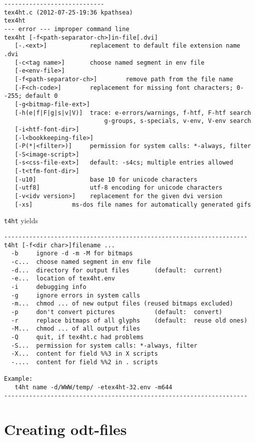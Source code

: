 \begin{Verbatim}[fontsize=\scriptsize]
----------------------------
tex4ht.c (2012-07-25-19:36 kpathsea)
tex4ht 
--- error --- improper command line
tex4ht [-f<path-separator-ch>]in-file[.dvi]
   [-.<ext>]            replacement to default file extension name .dvi
   [-c<tag name>]       choose named segment in env file
   [-e<env-file>]
   [-f<path-separator-ch>]        remove path from the file name
   [-F<ch-code>]        replacement for missing font characters; 0--255; default 0
   [-g<bitmap-file-ext>]
   [-h(e|f|F|g|s|v|V)]  trace: e-errors/warnings, f-htf, F-htf search
                            g-groups, s-specials, v-env, V-env search
   [-i<htf-font-dir>]
   [-l<bookkeeping-file>]
   [-P(*|<filter>)]     permission for system calls: *-always, filter
   [-S<image-script>]
   [-s<css-file-ext>]   default: -s4cs; multiple entries allowed
   [-t<tfm-font-dir>]
   [-u10]               base 10 for unicode characters
   [-utf8]              utf-8 encoding for unicode characters
   [-v<idv version>]    replacement for the given dvi version
   [-xs]           ms-dos file names for automatically generated gifs
\end{Verbatim}


\texttt{t4ht} yields 

\begin{Verbatim}[fontsize=\footnotesize]
--------------------------------------------------------------------
t4ht [-f<dir char>]filename ...
  -b     ignore -d -m -M for bitmaps
  -c...  choose named segment in env file
  -d...  directory for output files       (default:  current)
  -e...  location of tex4ht.env
  -i     debugging info
  -g     ignore errors in system calls
  -m...  chmod ... of new output files (reused bitmaps excluded)
  -p     don't convert pictures           (default:  convert)
  -r     replace bitmaps of all glyphs    (default:  reuse old ones)
  -M...  chmod ... of all output files
  -Q     quit, if tex4ht.c had problems
  -S...  permission for system calls: *-always, filter
  -X...  content for field %%3 in X scripts
  -....  content for field %%2 in . scripts

Example: 
   t4ht name -d/WWW/temp/ -etex4ht-32.env -m644
--------------------------------------------------------------------
\end{Verbatim}

\flushbottom

\section{Creating odt-files}\label{sec:tex2odt}

